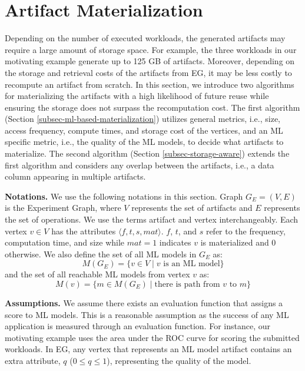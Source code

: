 \section{Artifact Materialization}\label{sec-materialization}
Depending on the number of executed workloads, the generated artifacts may require a large amount of storage space.
For example, the three workloads in our motivating example generate up to 125 GB of artifacts.
Moreover, depending on the storage and retrieval costs of the artifacts from EG, it may be less costly to recompute an artifact from scratch.
In this section, we introduce two algorithms for materializing the artifacts with a high likelihood of future reuse while ensuring the storage does not surpass the recomputation cost.
The first algorithm (Section \ref{subsec-ml-based-materialization}) utilizes general metrics, i.e., size, access frequency, compute times, and storage cost of the vertices, and an ML specific metric, i.e., the quality of the ML models, to decide what artifacts to materialize.
The second algorithm (Section \ref{subsec-storage-aware}) extends the first algorithm and considers any overlap between the artifacts, i.e., a data column appearing in multiple artifacts.

\textbf{Notations. }
We use the following notations in this section.
Graph $G_E = (V,E)$ is the Experiment Graph, where $V$ represents the set of artifacts and $E$ represents the set of operations.
We use the terms artifact and vertex interchangeably.
Each vertex $v \in V$ has the attributes $\langle f, t, s, mat \rangle$.
$f$, $t$, and $s$ refer to the frequency, computation time, and size while $mat=1$ indicates $v$ is materialized and $0$ otherwise.
We also define the set of all ML models in $G_E$ as:
\[
M(G_E) =  \{v \in V \mid v \text{ is an ML model}\}
\] 
and the set of all reachable ML models from vertex $v$ as:
\[
M(v) =  \{m \in M(G_E) \mid\text{there is path from } v \text{ to } m\}
\] 

\textbf{Assumptions. }
We assume there exists an evaluation function that assigns a score to ML models.
This is a reasonable assumption as the success of any ML application is measured through an evaluation function.
For instance, our motivating example uses the area under the ROC curve for scoring the submitted workloads.
In EG, any vertex that represents an ML model artifact contains an extra attribute, $q$ ($0 \leq q \leq 1$), representing the quality of the model.

